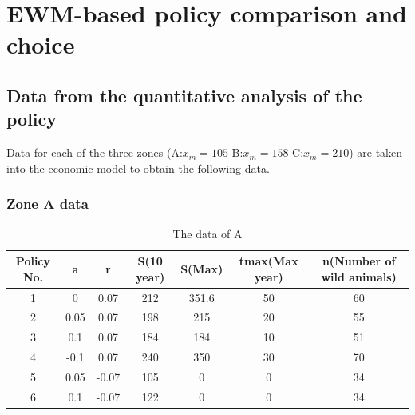 \documentclass{mcmthesis}
\numberwithin{figure}{section}
\numberwithin{table}{section}
\numberwithin{equation}{section}
\begin{document}
\section{EWM-based policy comparison and choice}

\subsection{Data from the quantitative analysis of the policy}
Data for each of the three zones (A:$x_m=105$ B:$x_m=158$ C:$x_m=210$) are taken into the economic model to obtain the following data.

\subsubsection{Zone A data}

\begin{table}[htbp]
    \centering
	\caption{The data of  A}
	\label{T 6.1}
    \begin{tabular}{ccccccc}
    \hline
Policy No.   & a    & r     & S(10 year) & S(Max) & tmax(Max year) & n(Number of wild animals) \\ \hline
    1                 & 0    & 0.07  & 212                & 351.6          & 50                            & 60                        \\
    2        & 0.05 & 0.07  & 198                & 215            & 20                            & 55                        \\
    3             & 0.1  & 0.07  & 184                & 184            & 10                            & 51                        \\
    4       & -0.1 & 0.07  & 240                & 350            & 30                            & 70                        \\
    5  & 0.05 & -0.07 & 105                & 0              & 0                             & 34                        \\
    6& 0.1  & -0.07 & 122                & 0              & 0                             & 34                        \\ \hline
    \end{tabular}
\end{table}
\end{document}
